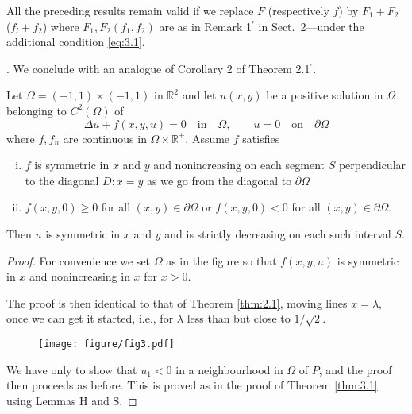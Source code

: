 \begin{remark}
  All the preceding results remain valid if we replace $F$ (respectively $f$) by $F_1+F_2$ ($f_l +f_2$) where $F_1,F_2(f_1,f_2)$ are as in Remark 1$^{\prime}$ in Sect.~2---under the additional
  condition \eqref{eq:3.1}.
\end{remark}

. We conclude with an analogue of Corollary 2 of Theorem 2.1$^{\prime}$.
\begin{remark}
  Let $\Omega = (- 1, 1)\times (- 1, 1)$ in $\mathbb{R}^2$ and let $u(x, y)$ 
  be a positive solution in $\Omega$ belonging to $C^2(\Omega)$ of
  \[ \Delta u+f(x,y,u)=0\quad\text{in}\quad\Omega,\qquad u=0\quad\text{on}\quad\partial\Omega \]
  where $f, f_n$ are continuous in $\bar{\Omega}\times\mathbb{R}^{+}$. Assume $f$ satisfies
  \begin{enumerate}[(i)]
    \item $f$ is symmetric in $x$ and $y$ and nonincreasing on each segment $S$ perpendicular to the diagonal $D:x = y$ as we go from the diagonal to $\partial\Omega$
    \item $f(x,y,0)\geq 0$ for all $(x,y)\in\partial\Omega$ or $f(x,y,0)<0$ for all $(x,y)\in\partial\Omega$.
  \end{enumerate}
  Then $u$ is symmetric in $x$ and $y$ and is strictly decreasing on each such interval $S$.
\end{remark}
\begin{proof}
  For convenience we set $\Omega$ as in the figure so that $f(x, y, u)$ is symmetric in $x$ and nonincreasing in $x$ for $x > 0$.
  
  The proof is then identical to that of Theorem \ref{thm:2.1}, 
  moving lines $x = \lambda$, once we can get it started, i.e.,
  for $\lambda$ less than but close to $1/\sqrt{2}$.

  \begin{figure}[htbp]
    \centering
    \texttt{[image: figure/fig3.pdf]}
    \caption{}
    \label{fig:3}
  \end{figure}
  
  We have only to show that $u_1 <0$ in a neighbourhood in $\Omega$ of $P$, and the proof then proceeds as before. This is proved as in the proof of Theorem \ref{thm:3.1} using Lemmas H and S.
\end{proof}